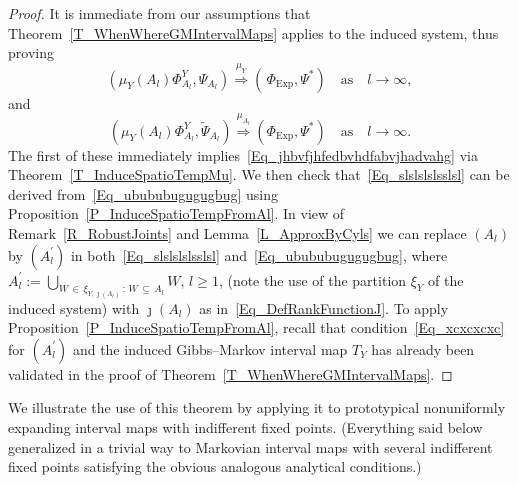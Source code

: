 \documentclass[10pt]{amsart}
\theoremstyle{definition}\newtheorem{defi}[theo]{Definition}\newtheorem{rema}[theo]{Remark}\newtheorem{exam}[theo]{Example}\newtheorem{exem}[theo]{Example}\newtheorem{nota}[theo]{Notation}
\newcommand{\Expl}{\mathrm{Exp}}
\begin{document}
\begin{proof}
It is immediate from our assumptions that Theorem~\ref{T_WhenWhereGMIntervalMaps} applies to the induced system, thus proving
\begin{equation}
\left(\mu_{Y}(A_{l})\Phi_{A_{l}}^{Y},\Psi_{A_{l}}\right)\overset{\mu_{Y}}{\Longrightarrow }\left(\,\Phi_{\Expl},\Psi^{\ast}\right)\quad\text{as}\quad  l\rightarrow\infty,
\end{equation}
and
\begin{equation}\label{Eq_ubububugugugbug}
\left(\mu_{Y}(A_{l})\Phi_{A_{l}}^{Y},\widetilde{\Psi}_{A_{l}}\right)\overset{\mu_{A_{l}}}{\Longrightarrow}\left(\Phi_{\Expl},\Psi^{\ast}\right)\quad\text{as}\quad  l\rightarrow\infty.
\end{equation}
The first of these immediately implies~\eqref{Eq_jhbvfjhfedbvhdfabvjhadvahg} via Theorem~\ref{T_InduceSpatioTempMu}. We then check that~\eqref{Eq_slslslslsslsl} can be derived from~\eqref{Eq_ubububugugugbug} using Proposition~\ref{P_InduceSpatioTempFromAl}. In view of Remark~\ref{R_RobustJoints} and Lemma~\ref{L_ApproxByCyls} we can replace $(A_{l})$ by $(A_{l}^{\prime})$ in both~\eqref{Eq_slslslslsslsl} and~\eqref{Eq_ubububugugugbug}, where $A_{l}^{\prime}:= {\textstyle\bigcup\nolimits_{W\,\in\,\xi_{Y,\jmath(A_{l})}\,:\,W\,\subseteq\,A_{l}}} W$, $l\geq1$, (note the use of the partition $\xi_{Y}$ of the induced system) with $\jmath(A_{l})$ as in~\eqref{Eq_DefRankFunctionJ}. To apply Proposition~\ref{P_InduceSpatioTempFromAl}, recall that condition~\eqref{Eq_xcxcxcxc} for $(A_{l}^{\prime})$ and the induced Gibbs--Markov interval map $T_{Y}$ has already been validated in the proof of Theorem~\ref{T_WhenWhereGMIntervalMaps}.
\end{proof}




We illustrate the use of this theorem by applying it to prototypical nonuniformly expanding interval maps with indifferent fixed points. (Everything said below generalized in a trivial way to Markovian interval maps with several indifferent fixed points satisfying the obvious analogous analytical conditions.)
\end{document}
